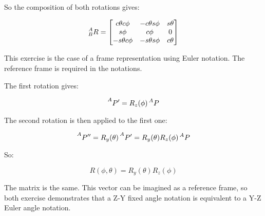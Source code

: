 \documentclass{exam}
\begin{document}
\begin{questions}
So the composition of both rotations gives:

\begin{equation}
  \prescript{A}{B}{R} = \begin{bmatrix}
                          c\theta c\phi  & -c\theta s\phi & s\theta \\
                          s\phi          & c\phi          & 0       \\
                          -s\theta c\phi & -s\theta s\phi & c\theta
                        \end{bmatrix}
\end{equation}

This exercise is the case of a frame representation using Euler notation. The reference frame is required in the notations.

\question

The first rotation gives:

\begin{equation}
  \prescript{A}{}{P'} = R_{z}(\phi) \prescript{A}{}{P}
\end{equation}

The second rotation is then applied to the first one:

\begin{equation}
  \prescript{A}{}{P''} = R_{y}(\theta) \prescript{A}{}{P'} = R_{y}(\theta) R_{z}(\phi) \prescript{A}{}{P}
\end{equation}

So:

\begin{equation}
  R(\phi, \theta) = R_{y}(\theta) R_{z}(\phi)
\end{equation}

The matrix is the same. This vector can be imagined as a reference frame, so both exercise demonstrates that a Z-Y fixed angle notation is equivalent to a Y-Z Euler angle notation.

\question

\end{questions}
\end{document}
